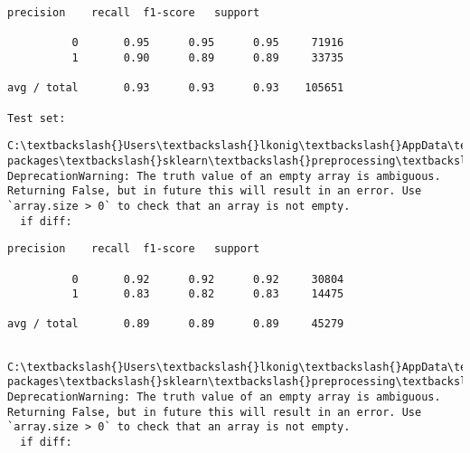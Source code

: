 \documentclass[11pt]{article}
\begin{document}
    \begin{Verbatim}[commandchars=\\\{\}]
             precision    recall  f1-score   support

          0       0.95      0.95      0.95     71916
          1       0.90      0.89      0.89     33735

avg / total       0.93      0.93      0.93    105651

Test set:

    \end{Verbatim}

    \begin{Verbatim}[commandchars=\\\{\}]
C:\textbackslash{}Users\textbackslash{}lkonig\textbackslash{}AppData\textbackslash{}Local\textbackslash{}Continuum\textbackslash{}anaconda3\textbackslash{}lib\textbackslash{}site-packages\textbackslash{}sklearn\textbackslash{}preprocessing\textbackslash{}label.py:151: DeprecationWarning: The truth value of an empty array is ambiguous. Returning False, but in future this will result in an error. Use `array.size > 0` to check that an array is not empty.
  if diff:

    \end{Verbatim}

    \begin{Verbatim}[commandchars=\\\{\}]
             precision    recall  f1-score   support

          0       0.92      0.92      0.92     30804
          1       0.83      0.82      0.83     14475

avg / total       0.89      0.89      0.89     45279


    \end{Verbatim}

    \begin{Verbatim}[commandchars=\\\{\}]
C:\textbackslash{}Users\textbackslash{}lkonig\textbackslash{}AppData\textbackslash{}Local\textbackslash{}Continuum\textbackslash{}anaconda3\textbackslash{}lib\textbackslash{}site-packages\textbackslash{}sklearn\textbackslash{}preprocessing\textbackslash{}label.py:151: DeprecationWarning: The truth value of an empty array is ambiguous. Returning False, but in future this will result in an error. Use `array.size > 0` to check that an array is not empty.
  if diff:

    \end{Verbatim}
\end{document}
